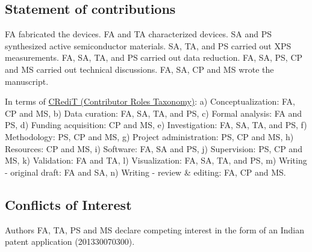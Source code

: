 \documentclass[12 pt]{article}
\begin{document}
\subsection*{Statement of contributions}

FA fabricated the devices. FA and TA characterized devices. SA and PS synthesized active semiconductor materials. SA, TA, and PS carried out XPS measurements. FA, SA, TA, and PS carried out data reduction. FA, SA, PS, CP and MS carried out technical discussions. FA, SA, CP and MS wrote the manuscript.

In terms of \href{https://casrai.org/credit/}{CRediT (Contributor Roles Taxonomy)}: a) Conceptualization: FA, CP and MS, b) Data curation: FA, SA, TA, and PS, c) Formal analysis: FA and PS, d) Funding acquisition: CP and MS, e) Investigation: FA, SA, TA, and PS, f) Methodology: PS, CP and MS, g) Project administration: PS, CP and MS, h) Resources: CP and MS, i) Software: FA, SA and PS, j) Supervision: PS, CP and MS, k) Validation: FA and TA, l) Visualization: FA, SA, TA, and PS, m) Writing - original draft: FA and SA, n) Writing - review \& editing: FA, CP and MS.

\subsection*{Conflicts of Interest}
Authors FA, TA, PS and MS declare competing interest in the form of an Indian patent application (201330070300).



\end{document}
